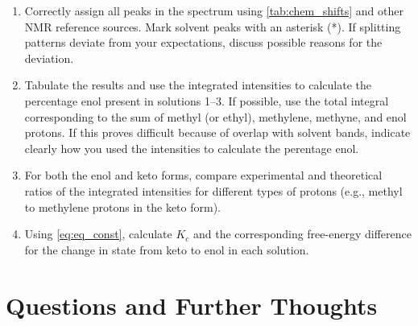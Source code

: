 \documentclass[nobib,nofonts,nols,nohyper]{tufte-handout}
\begin{document}
\begin{enumerate}
	\item Correctly assign all peaks in the spectrum using \cref{tab:chem_shifts} and other NMR reference sources.\autocite{davis1965advanced,pople1959nmr,silverstein2005spec,burdett1964a,rogers1956a}
	Mark solvent peaks with an asterisk (*). If splitting patterns deviate from your expectations, discuss possible reasons for the deviation. 
	\item Tabulate the results and use the integrated intensities to calculate the percentage enol present in solutions \numrange{1}{3}. 
	If possible, use the total integral corresponding to the sum of methyl (or ethyl), methylene, methyne, and enol protons. 
	If this proves difficult because of overlap with solvent bands, indicate clearly how you used the intensities to calculate the perentage enol. 
	\item For both the enol and keto forms, compare experimental and theoretical ratios of the integrated intensities for different types of protons (e.g., methyl to methylene protons in the keto form). 
	\item Using \cref{eq:eq_const}, calculate \( K_c \) and the corresponding free-energy difference  for the change in state from keto to enol in each solution. 
\end{enumerate}


\section{Questions and Further Thoughts} %
\label{sec:questions_and_further_thoughts}
\end{document}
